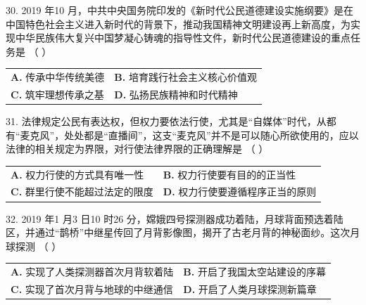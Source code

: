 \documentclass[UTF8,11pt]{ctexart}
\begin{document}
30. 2019 年10 月，中共中央国务院印发的《新时代公民道德建设实施纲要》是在中国特色社会主义进入新时代的背景下，推动我国精神文明建设再上新高度，为实现中华民族伟大复兴中国梦凝心铸魂的指导性文件，新时代公民道德建设的重点任务是 （    ）


\begin{center}\begin{tabular}{>{\raggedright\arraybackslash}p{\dimexpr(\linewidth-4\tabcolsep)/2\relax}>{\raggedright\arraybackslash}p{\dimexpr(\linewidth-4\tabcolsep)/2\relax}}
\textbf{A.} 传承中华传统美德 & \textbf{B.} 培育践行社会主义核心价值观\\[.35em]
\textbf{C.} 筑牢理想传承之基 & \textbf{D.} 弘扬民族精神和时代精神\\[.35em]\end{tabular}\end{center}

31. 法律规定公民有表达权，但权力要依法行使，尤其是“自媒体”时代，从都有“麦克风”，处处都是“直播间”，这支“麦克风”并不是可以随心所欲使用的，应以法律的相关规定为界限，对行使法律界限的正确理解是 （    ）


\begin{center}\begin{tabular}{>{\raggedright\arraybackslash}p{\dimexpr(\linewidth-4\tabcolsep)/2\relax}>{\raggedright\arraybackslash}p{\dimexpr(\linewidth-4\tabcolsep)/2\relax}}
\textbf{A.} 权力行使的方式具有唯一性 & \textbf{B.} 权力行使要有目的的正当性\\[.35em]
\textbf{C.} 群里行使不能超过法定的限度 & \textbf{D.} 权力行使要遵循程序正当的原则\\[.35em]\end{tabular}\end{center}

32. 2019 年1 月3 日10 时26 分，嫦娥四号探测器成功着陆，月球背面预选着陆区，并通过“鹊桥”中继星传回了月背影像图，揭开了古老月背的神秘面纱。这次月球探测 （    ）


\begin{center}\begin{tabular}{>{\raggedright\arraybackslash}p{\dimexpr(\linewidth-4\tabcolsep)/2\relax}>{\raggedright\arraybackslash}p{\dimexpr(\linewidth-4\tabcolsep)/2\relax}}
\textbf{A.} 实现了人类探测器首次月背软着陆 & \textbf{B.} 开启了我国太空站建设的序幕\\[.35em]
\textbf{C.} 实现了首次月背与地球的中继通信 & \textbf{D.} 开启了人类月球探测新篇章\\[.35em]\end{tabular}\end{center}
\end{document}
